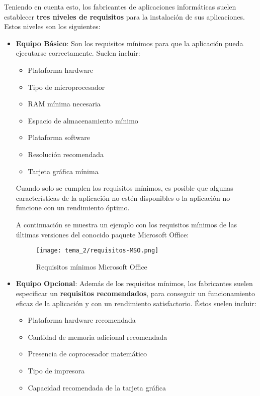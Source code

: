 Teniendo en cuenta esto, los fabricantes de aplicaciones informáticas suelen establecer \textbf{tres niveles de requisitos} para la instalación de sus aplicaciones. Estos niveles son los siguientes:

\begin{itemize}
    \item \textbf{Equipo Básico}: Son los requisitos mínimos para que la aplicación pueda ejecutarse correctamente. Suelen incluir:
    \begin{itemize}
        \item Plataforma hardware
        \item Tipo de microprocesador
        \item RAM mínima necesaria
        \item Espacio de almacenamiento mínimo
        \item Plataforma software
        \item Resolución recomendada
        \item Tarjeta gráfica mínima
    \end{itemize}

    Cuando solo se cumplen los requisitos mínimos, es posible que algunas características de la aplicación no estén disponibles o la aplicación no funcione con un rendimiento óptimo.

    A continuación se muestra un ejemplo con los requisitos mínimos de las últimas versiones del conocido paquete Microsoft Office:

    \begin{figure}[H]
        \centering
        \texttt{[image: tema\_2/requisitos-MSO.png]}
        \caption{Requisitos mínimos Microsoft Office}
    \end{figure}

    \item \textbf{Equipo Opcional}: Además de los requisitos mínimos, los fabricantes suelen especificar un \textbf{requisitos recomendados}, para conseguir un funcionamiento eficaz de la aplicación y con un rendimiento satisfactorio. Éstos suelen incluir:

    \begin{itemize}
        \item Plataforma hardware recomendada
        \item Cantidad de memoria adicional recomendada
        \item Presencia de coprocesador matemático
        \item Tipo de impresora
        \item Capacidad recomendada de la tarjeta gráfica
    \end{itemize}


\end{itemize}
